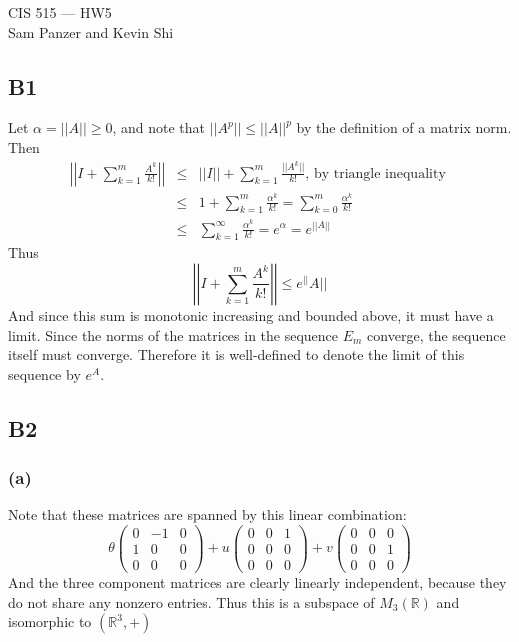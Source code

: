\documentclass{article}
\newcommand{\reals}{\mathbb{R}}
\newcommand{\norm}[1]{||#1||}
\newcommand{\bignorm}[1]{\left|\left|#1\right|\right|}
\begin{document}
\begin{center}CIS 515 --- HW5\\Sam Panzer and Kevin Shi\end{center}
\subsection{B1}
Let $\alpha =\norm{A} \geq 0$, and note that $\norm{A^p} \leq \norm{A}^p$ by the definition of a matrix norm.
Then 
\begin{eqnarray*}
\bignorm{I + \sum_{k=1}^m \frac{A^k}{k!}} &\leq&
\norm{I} + \sum_{k=1}^m \frac{\norm{A^k}}{k!} \text{,  by triangle inequality }\\
&\leq& 1 + \sum_{k=1}^m \frac{\alpha^k}{k!} = \sum_{k=0}^m \frac{\alpha^k}{k!}\\
&\leq& \sum_{k=1}^\infty \frac{\alpha^k}{k!} = e^\alpha = e^{\norm{A}}
\end{eqnarray*}
Thus
\[ \bignorm{I + \sum_{k=1}^m \frac{A^k}{k!}} \leq e^\norm{A}\]
And since this sum is monotonic increasing and bounded above, it must have a limit.
Since the norms of the matrices in the sequence $E_m$ converge, the sequence itself must converge.
Therefore it is well-defined to denote the limit of this sequence by $e^A$.

\subsection{B2}
\subsubsection{(a)}
Note that these matrices are spanned by this linear combination:
\[
\theta \left(\begin{array}{ccc}
  0 & -1 & 0\\
  1 & 0 & 0 \\
  0 & 0 & 0 
\end{array}\right) 
+
u \left(\begin{array}{ccc}
  0 & 0 & 1\\
  0 & 0 & 0 \\
  0 & 0 & 0 
\end{array}\right) 
+
v \left(\begin{array}{ccc}
  0 & 0 & 0\\
  0 & 0 & 1 \\
  0 & 0 & 0 
\end{array}\right) 
\]
And the three component matrices are clearly linearly independent, because they do not share any nonzero entries.
Thus this is a subspace of $M_3(\reals)$ and isomorphic to $(\reals^3,+)$
\end{document}
